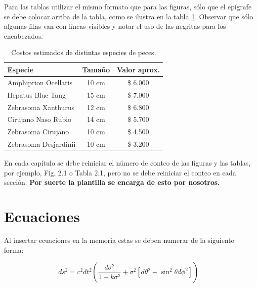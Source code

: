 

Para las tablas utilizar el mismo formato que para las figuras, sólo que el epígrafe se debe colocar arriba de la tabla, como se ilustra en la tabla \ref{tab:peces}. Observar que sólo algunas filas van con líneas visibles y notar el uso de las negritas para los encabezados.

\begin{table}[h]
	\centering
	\caption[Costos estimados de distintas especies de peces.]{Costos estimados de distintas especies de peces\protect\footnotemark.}
	\begin{tabular}{@{} l *2c @{}}    
		\toprule
		\textbf{Especie} 			& \textbf{Tamaño} 	& \textbf{Valor aprox.}  \\
		\midrule
		Amphiprion Ocellaris		& 10 cm 			& \$ 6.000 \\		
		Hepatus Blue Tang			& 15 cm				& \$ 7.000 \\
		Zebrasoma Xanthurus			& 12 cm				& \$ 6.800 \\
		Cirujano Naso Rubio			& 14 cm				& \$ 5.700 \\
		Zebrasoma Cirujano			& 10 cm				& \$ 4.500 \\ 
		Zebrasoma Desjardinii		& 10 cm 			& \$ 3.200 \\
		\bottomrule
		\hline
	\end{tabular}
	\label{tab:peces}
\end{table}


En cada capítulo se debe reiniciar el número de conteo de las figuras y las tablas, por ejemplo, Fig. 2.1 o Tabla 2.1, pero no se debe reiniciar el conteo en cada sección. \textbf{Por suerte la plantilla se encarga de esto por nosotros.}

\clearpage
\section{Ecuaciones}
\label{sec:Ecuaciones}

Al insertar ecuaciones en la memoria estas se deben numerar de la siguiente forma:

\begin{equation}
	\label{eq:metric}
	ds^2 = c^2 dt^2 \left( \frac{d\sigma^2}{1-k\sigma^2} + \sigma^2\left[ d\theta^2 + \sin^2\theta d\phi^2 \right] \right)
\end{equation}
                                                        
